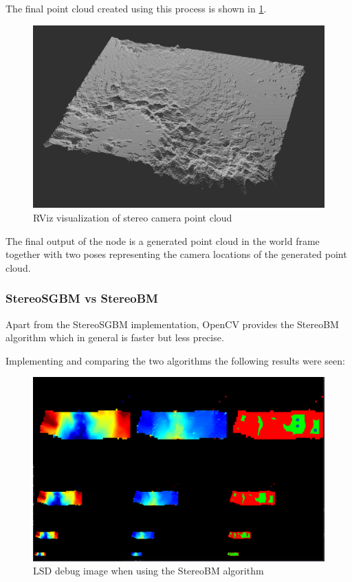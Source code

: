 The final point cloud created using this process is shown in \cref{fig:stereo_pc}.

\begin{figure}[h]
\centering
\includegraphics[scale=0.3]{images/stereo_camera_depth/stereo_pc.png}
\caption{RViz visualization of stereo camera point cloud}
\label{fig:stereo_pc}
\end{figure}

The final output of the node is a generated point cloud in the world frame together with two poses representing the camera locations of the generated point cloud.

\clearpage %

\subsubsection{StereoSGBM vs StereoBM}\label{subsec:bmvssgbm}

Apart from the StereoSGBM implementation, OpenCV provides the StereoBM algorithm which in general is faster but less precise.

Implementing and comparing the two algorithms the following results were seen:

\begin{figure}[h]
\centering
\includegraphics[scale=0.23]{images/stereo_camera_depth/stereoBM.png}
\caption{LSD debug image when using the StereoBM algorithm}
\label{fig:stereoBM}
\end{figure}

